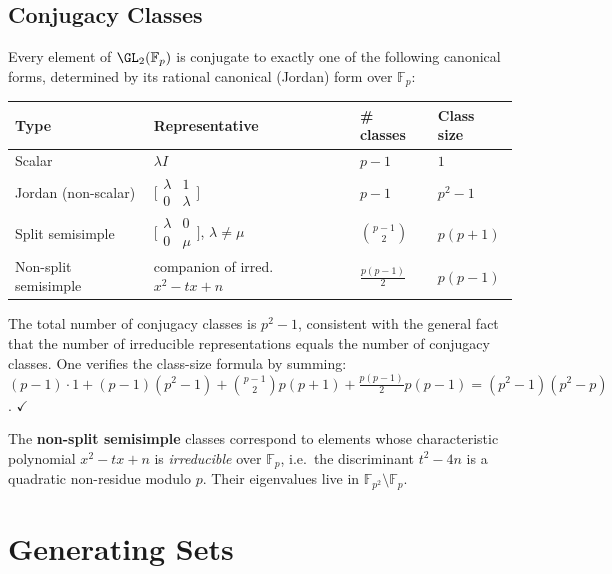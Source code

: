 \subsection{Conjugacy Classes}

Every element of $\GL_2(\mathbb{F}_p)$ is conjugate to exactly one of the
following canonical forms, determined by its rational canonical (Jordan) form
over $\mathbb{F}_p$:

\begin{center}
\renewcommand{\arraystretch}{1.4}
\begin{tabular}{llll}
\hline
\textbf{Type} & \textbf{Representative} & \textbf{\# classes} & \textbf{Class size} \\
\hline
Scalar & $\lambda I$ & $p - 1$ & $1$ \\
Jordan (non-scalar) & $\bigl[\begin{smallmatrix}\lambda & 1 \\ 0 & \lambda\end{smallmatrix}\bigr]$ & $p - 1$ & $p^2 - 1$ \\
Split semisimple & $\bigl[\begin{smallmatrix}\lambda & 0 \\ 0 & \mu\end{smallmatrix}\bigr]$, $\lambda \neq \mu$ & $\binom{p-1}{2}$ & $p(p+1)$ \\
Non-split semisimple & companion of irred.\ $x^2 - tx + n$ & $\frac{p(p-1)}{2}$ & $p(p-1)$ \\
\hline
\end{tabular}
\end{center}

The total number of conjugacy classes is $p^2 - 1$, consistent with the
general fact that the number of irreducible representations equals the number of
conjugacy classes.
One verifies the class-size formula by summing:
$(p-1)\cdot 1 + (p-1)(p^2-1) + \binom{p-1}{2}p(p+1) + \frac{p(p-1)}{2}p(p-1) = (p^2-1)(p^2-p)$. $\checkmark$

The \textbf{non-split semisimple} classes correspond to elements whose
characteristic polynomial $x^2 - tx + n$ is \emph{irreducible} over
$\mathbb{F}_p$, i.e.\ the discriminant $t^2 - 4n$ is a quadratic non-residue
modulo $p$.
Their eigenvalues live in $\mathbb{F}_{p^2} \setminus \mathbb{F}_p$.

\section{Generating Sets}

